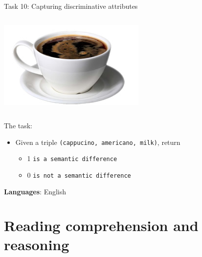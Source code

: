 \documentclass[10pt, compress]{beamer}
\begin{document}
\begin{frame}{Task 10: Capturing discriminative attributes}
\begin{columns}
\begin{column}{0.3\textwidth}
    \includegraphics[width=\textwidth]{graphics/discrim-americano.jpg}
  \end{column}
\end{columns}

The task:
\begin{itemize}
  \item Given a triple {\tt (cappucino, americano, milk)}, return
  \begin{itemize}
  \item 1 {\tt is a semantic difference}
  \item 0 {\tt is not a semantic difference}
  \end{itemize}
\end{itemize}

\textbf{Languages}: English

\end{frame}




\section{Reading comprehension and reasoning}
\end{document}
